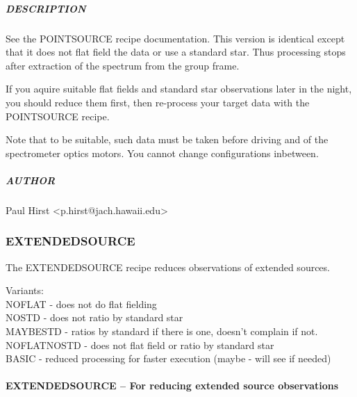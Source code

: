 \documentclass[twoside,11pt]{article}
\renewcommand{\_}{\texttt{\symbol{95}}}
\begin{document}
\subparagraph*{DESCRIPTION\label{POINT_SOURCE_NOFLAT_NOSTD_--_POINT_SOURCE_minus_flat-fielding_and_standard_stars_DESCRIPTION}}

See the POINT\_SOURCE recipe documentation. This version is identical
except that it does not flat field the data or use a standard
star. Thus processing stops after extraction of the spectrum from the
group frame.



If you aquire suitable flat fields and standard star observations
later in the night, you should reduce them first, then re-process your
target data with the POINT\_SOURCE recipe.



Note that to be suitable, such data must be taken before driving and
of the spectrometer optics motors. You cannot change configurations
inbetween.

\subparagraph*{AUTHOR\label{POINT_SOURCE_NOFLAT_NOSTD_--_POINT_SOURCE_minus_flat-fielding_and_standard_stars_AUTHOR}}

Paul Hirst <p.hirst@jach.hawaii.edu>


\subsubsection{EXTENDED\_SOURCE}

The EXTENDED\_SOURCE recipe reduces observations of extended sources.

Variants: \\
\_NOFLAT - does not do flat fielding \\
\_NOSTD - does not ratio by standard star \\
\_MAYBESTD - ratios by standard if there is one, doesn't complain if not. \\
\_NOFLAT\_NOSTD - does not flat field or ratio by standard star \\
\_BASIC - reduced processing for faster execution (maybe - will see if needed) \\

\paragraph*{EXTENDED\_SOURCE -- For reducing extended source observations\label{EXTENDED_SOURCE_--_For_reducing_extended_source_observations}}
\end{document}
